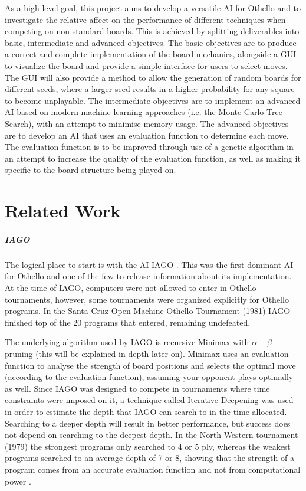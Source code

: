 \documentclass[12pt,a4paper]{article}
\begin{document}
As a high level goal, this project aims to develop a versatile AI for Othello and to investigate the relative affect on the performance of different techniques when competing on non-standard boards. This is achieved by splitting deliverables into basic, intermediate and advanced objectives. The basic objectives are to produce a correct and complete implementation of the board mechanics, alongside a GUI to visualize the board and provide a simple interface for users to select moves. The GUI will also provide a method to allow the generation of random boards for different seeds, where a larger seed results in a higher probability for any square to become unplayable.
The intermediate objectives are to implement an advanced AI based on modern machine learning approaches (i.e. the Monte Carlo Tree Search), with an attempt to minimise memory usage. The advanced objectives are to develop an AI that uses an evaluation function to determine each move. The evaluation function is to be improved through use of a genetic algorithm in an attempt to increase the quality of the evaluation function, as well as making it specific to the board structure being played on.


\section{Related Work}


\subparagraph*{IAGO}

The logical place to start is with the AI IAGO \cite{rosenbloom1982world}. This was the first dominant AI for Othello and one of the few to release information about its implementation. At the time of IAGO, computers were not allowed to enter in Othello tournaments, however, some tournaments were organized explicitly for Othello programs. In the Santa Cruz Open Machine Othello Tournament (1981) IAGO finished top of the 20 programs that entered, remaining undefeated. 

The underlying algorithm used by IAGO is recursive Minimax with $\alpha-\beta$ pruning (this will be explained in depth later on). Minimax uses an evaluation function to analyse the strength of board positions and selects the optimal move (according to the evaluation function), assuming your opponent plays optimally as well. Since IAGO was designed to compete in tournaments where time constraints were imposed on it, a technique called Iterative Deepening was used in order to estimate the depth that IAGO can search to in the time allocated. Searching to a deeper depth will result in better performance, but success does not depend on searching to the deepest depth. In the North-Western tournament (1979) the strongest programs only searched to 4 or 5 ply, whereas the weakest programs searched to an average depth of 7 or 8, showing that the strength of a program comes from an accurate evaluation function and not from computational power \cite{rosenbloom1982world}.
\end{document}
